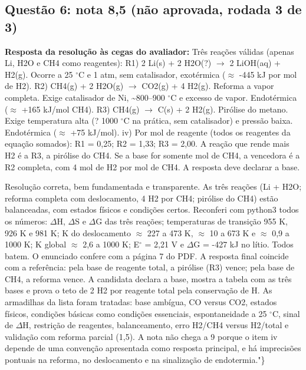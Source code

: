 \documentclass{article}%
\begin{document}
\subsection*{Questão 6: nota 8,5 (não aprovada, rodada 3 de 3)}%
\textbf{Resposta da resolução às cegas do avaliador:} Três reações válidas (apenas Li, H2O e CH4 como reagentes):\newline%
\newline%
R1) 2 Li(s) + 2 H2O(?) $\to$ 2 LiOH(aq) + H2(g). Ocorre a 25 $^\circ$C e 1 atm, sem catalisador, exotérmica ($\approx$ -445 kJ por mol de H2).\newline%
\newline%
R2) CH4(g) + 2 H2O(g) $\to$ CO2(g) + 4 H2(g). Reforma a vapor completa. Exige catalisador de Ni, \textasciitilde{}800--900 $^\circ$C e excesso de vapor. Endotérmica ($\approx$ +165 kJ/mol CH4).\newline%
\newline%
R3) CH4(g) $\to$ C(s) + 2 H2(g). Pirólise do metano. Exige temperatura alta (? 1000 $^\circ$C na prática, sem catalisador) e pressão baixa. Endotérmica ($\approx$ +75 kJ/mol).\newline%
\newline%
iv) Por mol de reagente (todos os reagentes da equação somados): R1 = 0,25; R2 = 1,33; R3 = 2,00. A reação que rende mais H2 é a R3, a pirólise do CH4. Se a base for somente mol de CH4, a vencedora é a R2 completa, com 4 mol de H2 por mol de CH4. A resposta deve declarar a base.\par %
Resolução correta, bem fundamentada e transparente. As três reações (Li + H2O; reforma completa com deslocamento, 4 H2 por CH4; pirólise do CH4) estão balanceadas, com estados físicos e condições certos. Reconferi com python3 todos os números: $\Delta$H, $\Delta$S e $\Delta$G das três reações; temperaturas de transição 955 K, 926 K e 981 K; K do deslocamento $\approx$ 227 a 473 K, $\approx$ 10 a 673 K e $\approx$ 0,9 a 1000 K; K global $\approx$ 2,6 a 1000 K; E$^\circ$ = 2,21 V e $\Delta$G = -427 kJ no lítio. Todos batem. O enunciado confere com a página 7 do PDF. A resposta final coincide com a referência: pela base de reagente total, a pirólise (R3) vence; pela base de CH4, a reforma vence. A candidata declara a base, mostra a tabela com as três bases e prova o teto de 2 H2 por reagente total pela conservação de H. As armadilhas da lista foram tratadas: base ambígua, CO versus CO2, estados físicos, condições básicas como condições essenciais, espontaneidade a 25 $^\circ$C, sinal de $\Delta$H, restrição de reagentes, balanceamento, erro H2/CH4 versus H2/total e validação com reforma parcial (1,5). A nota não chega a 9 porque o item iv depende de uma convenção apresentada como resposta principal, e há imprecisões pontuais na reforma, no deslocamento e na sinalização de endotermia."\}%
\end{document}
